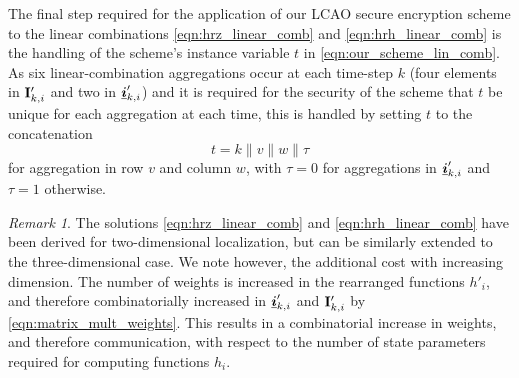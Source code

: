 \documentclass[10pt,letterpaper,oneside,twocolumn,journal]{IEEEtran}
\theoremstyle{definition}
\theoremstyle{definition}
\theoremstyle{remark}
\newtheorem*{remark}{Remark}
\begin{document}
The final step required for the application of our LCAO secure encryption scheme to the linear combinations \eqref{eqn:hrz_linear_comb} and \eqref{eqn:hrh_linear_comb} is the handling of the scheme's instance variable $t$ in \eqref{eqn:our_scheme_lin_comb}. As six linear-combination aggregations occur at each time-step $k$ (four elements in ${{\mathbf{I}}}'_{k,i}$ and two in ${\boldsymbol{\underline{i}}}'_{k,i}$) and it is required for the security of the scheme that $t$ be unique for each aggregation at each time, this is handled by setting $t$ to the concatenation 
\begin{equation}
    t=k\mathbin\|v\mathbin\|w\mathbin\|\tau
\end{equation}
for aggregation in row $v$ and column $w$, with $\tau=0$ for aggregations in ${\boldsymbol{\underline{i}}}'_{k,i}$ and $\tau=1$ otherwise.
\begin{remark}
    The solutions \eqref{eqn:hrz_linear_comb} and \eqref{eqn:hrh_linear_comb} have been derived for two-dimensional localization, but can be similarly extended to the three-dimensional case. We note however, the additional cost with increasing dimension. The number of weights is increased in the rearranged functions $h'_i$, and therefore combinatorially increased in ${\boldsymbol{\underline{i}}}'_{k,i}$ and ${{\mathbf{I}}}'_{k,i}$ by \eqref{eqn:matrix_mult_weights}. This results in a combinatorial increase in weights, and therefore communication, with respect to the number of state parameters required for computing functions $h_i$.
\end{remark}

% 
% 
\end{document}
